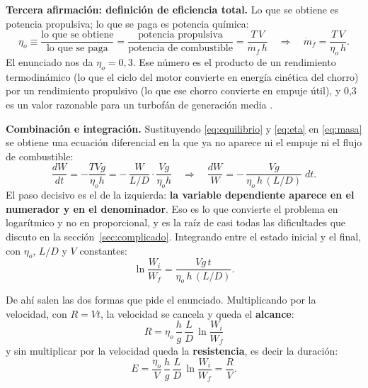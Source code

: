 \documentclass[11pt,letterpaper]{article}
\begin{document}
\textbf{Tercera afirmación: definición de eficiencia total.} Lo que se obtiene
es potencia propulsiva; lo que se paga es potencia química:
\begin{equation}
\eta_o \equiv \frac{\text{lo que se obtiene}}{\text{lo que se paga}}
        = \frac{\text{potencia propulsiva}}{\text{potencia de combustible}}
        = \frac{T\,V}{\dot{m}_f\, h}
\quad\Longrightarrow\quad
\dot{m}_f = \frac{T\,V}{\eta_o\, h}.
\label{eq:eta}
\end{equation}
El enunciado nos da \(\eta_o = 0{,}3\). Ese número es el producto de un
rendimiento termodinámico (lo que el ciclo del motor convierte en energía
cinética del chorro) por un rendimiento propulsivo (lo que ese chorro convierte
en empuje útil), y 0,3 es un valor razonable para un turbofán de generación
media \parencite{mitthermo}.

\textbf{Combinación e integración.} Sustituyendo \eqref{eq:equilibrio} y
\eqref{eq:eta} en \eqref{eq:masa} se obtiene una ecuación diferencial en la que
ya no aparece ni el empuje ni el flujo de combustible:
\begin{equation}
\frac{dW}{dt}
  = -\frac{T V g}{\eta_o h}
  = -\,\frac{W}{L/D}\cdot\frac{V g}{\eta_o h}
\quad\Longrightarrow\quad
\frac{dW}{W} = -\,\frac{V g}{\eta_o\, h\,(L/D)}\; dt .
\label{eq:edo}
\end{equation}
El paso decisivo es el de la izquierda: \textbf{la variable dependiente aparece
en el numerador y en el denominador}. Eso es lo que convierte el problema en
logarítmico y no en proporcional, y es la raíz de casi todas las dificultades
que discuto en la sección~\ref{sec:complicado}. Integrando entre el estado
inicial y el final, con \(\eta_o\), \(L/D\) y \(V\) constantes:
\begin{equation}
\ln\frac{W_i}{W_f} = \frac{V g\, t}{\eta_o\, h\,(L/D)} .
\end{equation}

De ahí salen las dos formas que pide el enunciado. Multiplicando por la
velocidad, con \(R = V t\), la velocidad se cancela y queda el
\textbf{alcance}:
\begin{equation}
\boxed{\;R = \eta_o\,\frac{h}{g}\,\frac{L}{D}\,\ln\frac{W_i}{W_f}\;}
\label{eq:breguet}
\end{equation}
y sin multiplicar por la velocidad queda la \textbf{resistencia}, es decir la
duración:
\begin{equation}
E = \frac{\eta_o}{V}\,\frac{h}{g}\,\frac{L}{D}\,\ln\frac{W_i}{W_f}
  = \frac{R}{V} .
\label{eq:endurance}
\end{equation}
\end{document}
